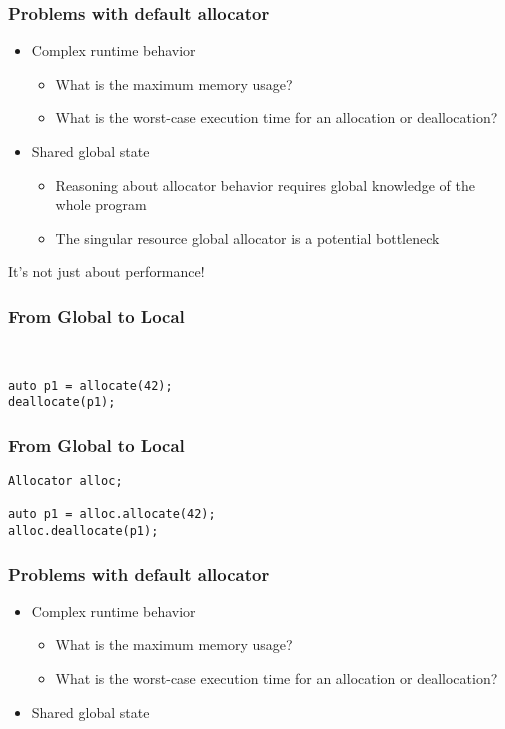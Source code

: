 \documentclass[aspectratio=169]{beamer}
\begin{document}
\begin{frame}
  \frametitle{Problems with default allocator}

  \begin{itemize}
  \item Complex runtime behavior
    \begin{itemize}
    \item What is the maximum memory usage?
    \item What is the worst-case execution time for an allocation or deallocation?
    \end{itemize}

  \item Shared global state
    \begin{itemize}
    \item Reasoning about allocator behavior requires global knowledge of the whole program
    \item The singular resource global allocator is a potential bottleneck
    \end{itemize}
  \end{itemize}

  It's not just about performance!
\end{frame}


\begin{frame}[fragile]
  \frametitle{From Global to Local}
  
  \begin{lstlisting}


auto p1 = allocate(42);
deallocate(p1);
  \end{lstlisting}
\end{frame}


\begin{frame}[fragile]
  \frametitle{From Global to Local}
  
  \begin{lstlisting}
Allocator alloc;

auto p1 = alloc.allocate(42);
alloc.deallocate(p1);
  \end{lstlisting}
\end{frame}


\begin{frame}
  \frametitle{Problems with default allocator}

  \begin{itemize}
  \item Complex runtime behavior
    \begin{itemize}
    \item What is the maximum memory usage?
    \item What is the worst-case execution time for an allocation or deallocation?
    \end{itemize}

  \item {\color{red}Shared global state} \checkmark
  \end{itemize}
\end{frame}
\end{document}
